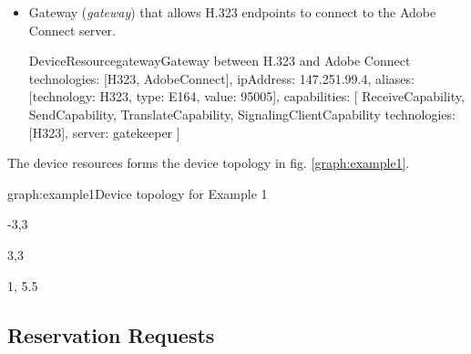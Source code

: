 \begin{itemize}
\item Gateway (\emph{gateway}) that allows H.323 endpoints to connect to
  the Adobe Connect server.
    
\begin{EntityExample}{DeviceResource}{gateway}{Gateway between H.323 and Adobe Connect}
technologies: [H323, AdobeConnect], 
ipAddress: 147.251.99.4,
aliases: [{technology: H323, type: E164, value: 95005}],
capabilities: [
  ReceiveCapability, SendCapability,
  TranslateCapability,
  SignalingClientCapability {technologies: [H323], server: gatekeeper}
]
\end{EntityExample}

\end{itemize}

The device resources forms the device topology in fig. \ref{graph:example1}. 

\begin{Graph}{graph:example1}{Device topology for Example 1}  
  \begin{SubGraph}{-3,3}{}
  \end{SubGraph}
  
  \begin{SubGraph}{3,3}{}
  \end{SubGraph}
  
  
  \begin{GraphLegend}{1, 5.5}
  \end{GraphLegend}
\end{Graph}

\subsection{Reservation Requests}

